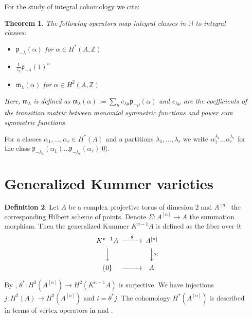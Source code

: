 \documentclass{amsart}
\newcommand{\hilb}[1]{^{[#1]}}
\newcommand{\vac}{|0\rangle}
\newcommand{\p}{\mathfrak{p}}
\renewcommand{\H}{\mathbb{H}}
\newcommand{\Z}{\mathbb{Z}}
\theoremstyle{plain}
\newtheorem{theorem}{Theorem}[section]
\theoremstyle{definition}
\newtheorem{definition}[theorem]{Definition}
\theoremstyle{remark}
\begin{document}
For the study of integral cohomology we cite:
\begin{theorem} \cite{QinWang}
The following operators map integral classes in $\H$ to integral classes:
\begin{itemize}
\item $\p_{-\lambda}(\alpha)$ for $\alpha \in H^*(A,\Z)$ 
\item $\frac{1}{z_\lambda}\p_{-\lambda}(1)^n$ 
\item $\mathfrak{m}_{\lambda}(\alpha)$ for $\alpha \in H^2(A,\Z)$ 
\end{itemize}
Here, $\mathfrak{m}_{\lambda}$ is defined as $\mathfrak{m}_{\lambda}(\alpha):=\sum_{\mu} c_{\lambda\mu} \p_{-\mu}(\alpha) $ and $c_{\lambda\mu}$ are the coefficients of the transition matrix between monomial symmetric functions and power sum symmetric functions.
\end{theorem}
For a classes $\alpha_1,\ldots ,\alpha_r \in H^*(A)$ and a partitions $\lambda_1,\ldots, \lambda_r$ we write $\alpha_1^{\lambda_1}\ldots\alpha_r^{\lambda_r}$ for the class $\p_{-\lambda_1}(\alpha_1)\ldots\p_{-\lambda_r}(\alpha_r)\vac$.
\section{Generalized Kummer varieties}
\begin{definition}
Let $A$ be a complex projective torus of dimesion $2$ and $A\hilb{n}$ the corresponding Hilbert scheme of points. Denote $\Sigma : A\hilb{n} \rightarrow A$ the summation morphism. Then the generalized Kummer $K^{n-1} A $ is defined as the fiber over $0$:
\begin{equation}\label{square}
\begin{CD}
K^{n-1}A @>\theta >> A\hilb{n}\\
@VVV @VV\Sigma V\\
\{0\} @> >> A
\end{CD}
\end{equation}
\end{definition}
By \cite{Beauville}, $\theta^{\ast} : H^2(A\hilb{n}) \rightarrow H^2(K^{n-1}A)$ is surjective. We have injections $j : H^2(A)\rightarrow H^2(A\hilb{n})$ and $i = \theta^* j$. The cohomology $H^*(A\hilb{n})$ is described in terms of vertex operators in \cite{LehnSorger} and \cite{LiQinWang}.
\end{document}
